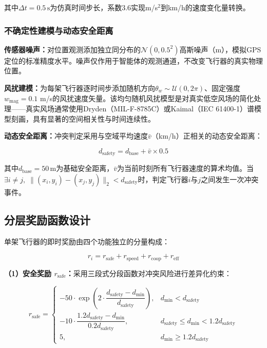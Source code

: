 \documentclass[12pt,a4paper,UTF8]{ctexart}
\begin{document}
其中$\Delta t = 0.5\,\text{s}$为仿真时间步长，系数3.6实现m/s$^2$到km/h的速度变化量转换。

\subsubsection{不确定性建模与动态安全距离}

\textbf{传感器噪声：}对位置观测添加独立同分布的$\mathcal{N}(0, 0.5^2)$高斯噪声（m），模拟GPS定位的标准精度水平。噪声仅作用于智能体的观测通道，不改变飞行器的真实物理位置。

\textbf{风扰建模：}为每架飞行器逐时间步添加随机方向$\theta_w \sim \mathcal{U}(0, 2\pi)$、固定强度$w_{\text{mag}} = 0.1$ m/s的风扰速度矢量。该均匀随机风扰模型是对真实低空风场的简化处理——真实风场通常使用Dryden（MIL-F-8785C）\cite{ref20}或Kaimal（IEC 61400-1）谱模型刻画，具有显著的空间相关性与时间连续性。

\textbf{动态安全距离：}冲突判定采用与空域平均速度$\bar{v}$（km/h）正相关的动态安全距离：

\begin{equation}
    d_{\text{safety}} = d_{\text{base}} + \bar{v} \times 0.5
\end{equation}

其中$d_{\text{base}} = 50\,\text{m}$为基础安全距离，$\bar{v}$为当前时刻所有飞行器速度的算术均值。当$\exists i \neq j,\; \|(x_i, y_i) - (x_j, y_j)\|_2 < d_{\text{safety}}$时，判定飞行器$i$与$j$之间发生一次冲突事件。

\subsection{分层奖励函数设计}

单架飞行器的即时奖励由四个功能独立的分量构成：

\begin{equation}
    r_i = r_{\text{safe}} + r_{\text{speed}} + r_{\text{coop}} + r_{\text{eff}}
\end{equation}

\textbf{（1）安全奖励 $r_{\text{safe}}$：}采用三段式分段函数对冲突风险进行差异化约束：

\begin{equation}
    r_{\text{safe}} =
    \begin{cases}
        -50 \cdot \exp\left(2 \cdot \dfrac{d_{\text{safety}} - d_{\min}}{d_{\text{safety}}}\right), & d_{\min} < d_{\text{safety}} \\[10pt]
        -10 \cdot \dfrac{1.2d_{\text{safety}} - d_{\min}}{0.2d_{\text{safety}}}, & d_{\text{safety}} \leq d_{\min} < 1.2d_{\text{safety}} \\[10pt]
        5, & d_{\min} \geq 1.2d_{\text{safety}}
    \end{cases}
\end{equation}
\end{document}
